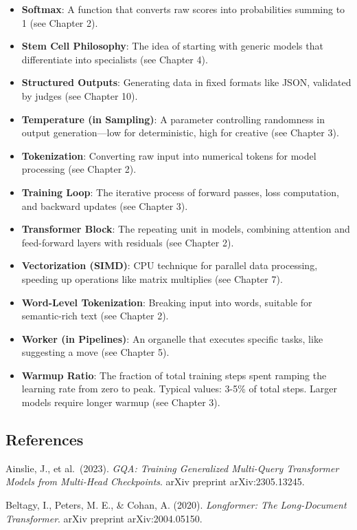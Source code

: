 \documentclass[
]{article}
\begin{document}
\begin{itemize}
  tokens for efficiency on long sequences (see Chapter 8).
\item
  \textbf{Softmax}: A function that converts raw scores into
  probabilities summing to 1 (see Chapter 2).
\item
  \textbf{Stem Cell Philosophy}: The idea of starting with generic
  models that differentiate into specialists (see Chapter 4).
\item
  \textbf{Structured Outputs}: Generating data in fixed formats like
  JSON, validated by judges (see Chapter 10).
\item
  \textbf{Temperature (in Sampling)}: A parameter controlling randomness
  in output generation---low for deterministic, high for creative (see
  Chapter 3).
\item
  \textbf{Tokenization}: Converting raw input into numerical tokens for
  model processing (see Chapter 2).
\item
  \textbf{Training Loop}: The iterative process of forward passes, loss
  computation, and backward updates (see Chapter 3).
\item
  \textbf{Transformer Block}: The repeating unit in models, combining
  attention and feed-forward layers with residuals (see Chapter 2).
\item
  \textbf{Vectorization (SIMD)}: CPU technique for parallel data
  processing, speeding up operations like matrix multiplies (see Chapter
  7).
\item
  \textbf{Word-Level Tokenization}: Breaking input into words, suitable
  for semantic-rich text (see Chapter 2).
\item
  \textbf{Worker (in Pipelines)}: An organelle that executes specific
  tasks, like suggesting a move (see Chapter 5).
\item
  \textbf{Warmup Ratio}: The fraction of total training steps spent
  ramping the learning rate from zero to peak. Typical values: 3-5\% of
  total steps. Larger models require longer warmup (see Chapter 3).
\end{itemize}

\subsection{References}\label{references}

Ainslie, J., et al.~(2023). \emph{GQA: Training Generalized Multi-Query
Transformer Models from Multi-Head Checkpoints}. arXiv preprint
arXiv:2305.13245.

Beltagy, I., Peters, M. E., \& Cohan, A. (2020). \emph{Longformer: The
Long-Document Transformer}. arXiv preprint arXiv:2004.05150.
\end{document}
